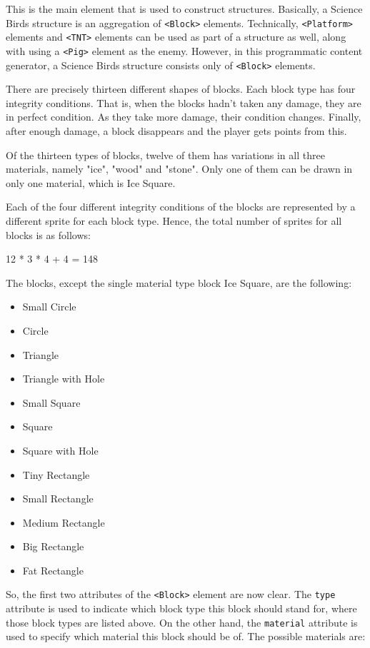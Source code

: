 \documentclass[12pt]{dalthesis}
\begin{document}
\begin{enumerate}
\begin{enumerate}
    This is the main element that is used to construct structures. Basically, a Science Birds structure is an aggregation of \lstinline{<Block>} elements. Technically, \lstinline{<Platform>} elements and \lstinline{<TNT>} elements can be used as part of a structure as well, along with using a \lstinline{<Pig>} element as the enemy. However, in this programmatic content generator, a Science Birds structure consists only of \lstinline{<Block>} elements.

    There are precisely thirteen different shapes of blocks. Each block type has four integrity conditions. That is, when the blocks hadn't taken any damage, they are in perfect condition. As they take more damage, their condition changes. Finally, after enough damage, a block disappears and the player gets points from this.

    Of the thirteen types of blocks, twelve of them has variations in all three materials, namely "ice", "wood" and "stone". Only one of them can be drawn in only one material, which is Ice Square.

    Each of the four different integrity conditions of the blocks are represented by a different sprite for each block type. Hence, the total number of sprites for all blocks is as follows:

        12 * 3 * 4 + 4 = 148

    The blocks, except the single material type block Ice Square, are the following:

    \begin{itemize}
      \item Small Circle
      \item Circle
      \item Triangle
      \item Triangle with Hole
      \item Small Square
      \item Square
      \item Square with Hole
      \item Tiny Rectangle
      \item Small Rectangle
      \item Medium Rectangle
      \item Big Rectangle
      \item Fat Rectangle
    \end{itemize}

    So, the first two attributes of the \lstinline{<Block>} element are now clear. The \lstinline{type} attribute is used to indicate which block type this block should stand for, where those block types are listed above. On the other hand, the \lstinline{material} attribute is used to specify which material this block should be of. The possible materials are:


\end{enumerate}
\end{enumerate}
\end{document}
